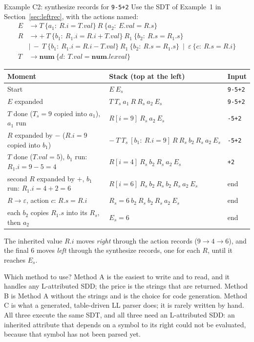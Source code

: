 \documentclass[11pt,a4paper]{article}
\begin{document}
\begin{examplebox}{Example C2: synthesize records for \texttt{9-5+2}}
Use the SDT of Example~1 in Section~\ref{sec:leftrec}, with the actions named:
\begin{align*}
E &\to T\ \{a_1:\ R.i=T.val\}\ R\ \{a_2:\ E.val=R.s\}\\
R &\to +\ T\ \{b_1:\ R_1.i=R.i+T.val\}\ R_1\ \{b_2:\ R.s=R_1.s\}\\
  &\mid\ -\ T\ \{b_1:\ R_1.i=R.i-T.val\}\ R_1\ \{b_2:\ R.s=R_1.s\}\ \mid\ \varepsilon\ \{c:\ R.s=R.i\}\\
T &\to \mathbf{num}\ \{d:\ T.val=\mathbf{num}.lexval\}
\end{align*}
\begin{center}
\small
\begin{tabular}{@{}p{4.2cm} p{7.8cm} l@{}}
\toprule
\textbf{Moment} & \textbf{Stack (top at the left)} & \textbf{Input} \\ \midrule
Start & $E\ E_s$ & \texttt{9-5+2} \\
$E$ expanded & $T\ T_s\ a_1\ R\ R_s\ a_2\ E_s$ & \texttt{9-5+2} \\
$T$ done ($T_s{=}9$ copied into $a_1$), $a_1$ run & $R[i{=}9]\ R_s\ a_2\ E_s$ & \texttt{-5+2} \\
$R$ expanded by $-$ ($R.i=9$ copied into $b_1$) & $-\ T\ T_s\ [b_1:\ R.i{=}9]\ R\ R_s\ b_2\ R_s\ a_2\ E_s$ & \texttt{-5+2} \\
$T$ done ($T.val=5$), $b_1$ run: $R_1.i=9-5=4$ & $R[i{=}4]\ R_s\ b_2\ R_s\ a_2\ E_s$ & \texttt{+2} \\
second $R$ expanded by $+$, $b_1$ run: $R_1.i=4+2=6$ & $R[i{=}6]\ R_s\ b_2\ R_s\ b_2\ R_s\ a_2\ E_s$ & end \\
$R\to\varepsilon$, action $c$: $R.s=R.i$ & $R_s{=}6\ b_2\ R_s\ b_2\ R_s\ a_2\ E_s$ & end \\
each $b_2$ copies $R_1.s$ into its $R_s$, then $a_2$ & $E_s{=}6$ & end \\ \bottomrule
\end{tabular}
\end{center}
The inherited value $R.i$ moves \emph{right} through the action records ($9\to4\to6$), and the final $6$ moves \emph{left} through the synthesize records, one for each $R$, until it reaches $E_s$.
\end{examplebox}

\begin{notebox}{Which method to use?}
Method A is the easiest to write and to read, and it handles any L-attributed SDD; the price is the strings that are returned. Method B is Method A without the strings and is the choice for code generation. Method C is what a generated, table-driven LL parser does; it is rarely written by hand. All three execute the same SDT, and all three need an L-attributed SDD: an inherited attribute that depends on a symbol to its right could not be evaluated, because that symbol has not been parsed yet.
\end{notebox}
\end{document}
